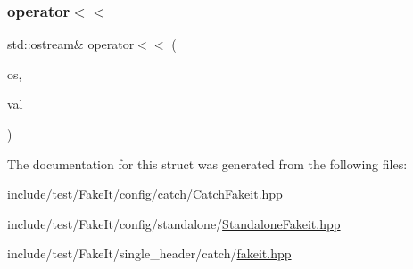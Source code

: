 \mbox{\label{structfakeit_1_1VerificationException_aa98da35f957de7b536fe6755789e97de}} 
\subsubsection{\texorpdfstring{operator$<$$<$}{operator<<}\hspace{0.1cm}{\footnotesize\ttfamily [2/2]}}
{\footnotesize\ttfamily std\+::ostream\& operator$<$$<$ (\begin{DoxyParamCaption}\item[{std\+::ostream \&}]{os,  }\item[{const \mbox{\hyperlink{structfakeit_1_1VerificationException}{Verification\+Exception}} \&}]{val }\end{DoxyParamCaption})\hspace{0.3cm}{\ttfamily [friend]}}



The documentation for this struct was generated from the following files\+:\begin{DoxyCompactItemize}
\item 
include/test/\+Fake\+It/config/catch/\mbox{\hyperlink{CatchFakeit_8hpp}{Catch\+Fakeit.\+hpp}}\item 
include/test/\+Fake\+It/config/standalone/\mbox{\hyperlink{StandaloneFakeit_8hpp}{Standalone\+Fakeit.\+hpp}}\item 
include/test/\+Fake\+It/single\+\_\+header/catch/\mbox{\hyperlink{single__header_2catch_2fakeit_8hpp}{fakeit.\+hpp}}\end{DoxyCompactItemize}
